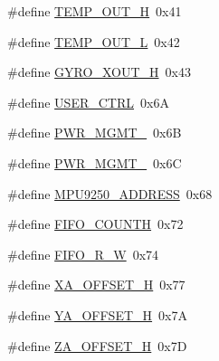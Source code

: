 \begin{DoxyCompactItemize}
\#define \hyperlink{i2c-interface_8c_ae8c4c28fe604535a3a57d0536c6e8175}{T\+E\+M\+P\+\_\+\+O\+U\+T\+\_\+H}~0x41
\item 
\#define \hyperlink{i2c-interface_8c_a7fe4a13198c0b3d8cf09802e7247fd2c}{T\+E\+M\+P\+\_\+\+O\+U\+T\+\_\+L}~0x42
\item 
\#define \hyperlink{i2c-interface_8c_a0016198ccf5ca2b7f41d7a23e6554373}{G\+Y\+R\+O\+\_\+\+X\+O\+U\+T\+\_\+H}~0x43
\item 
\#define \hyperlink{i2c-interface_8c_abd9eebb35aad7616fe0414952e2d477d}{U\+S\+E\+R\+\_\+\+C\+T\+RL}~0x6A
\item 
\#define \hyperlink{i2c-interface_8c_a96169eb207e721c1546cea9ffd8a35e4}{P\+W\+R\+\_\+\+M\+G\+M\+T\+\_}~0x6B
\item 
\#define \hyperlink{i2c-interface_8c_a23cfbcfd19dc88eb631309970f138e65}{P\+W\+R\+\_\+\+M\+G\+M\+T\+\_}~0x6C
\item 
\#define \hyperlink{i2c-interface_8c_af4d54e584a662662888836b3a9b9eb08}{M\+P\+U9250\+\_\+\+A\+D\+D\+R\+E\+SS}~0x68
\item 
\#define \hyperlink{i2c-interface_8c_adbbef0e95665e066deb615f04b347491}{F\+I\+F\+O\+\_\+\+C\+O\+U\+N\+TH}~0x72
\item 
\#define \hyperlink{i2c-interface_8c_ac12b6d897ba3ad98caeb3bd070c1c158}{F\+I\+F\+O\+\_\+\+R\+\_\+W}~0x74
\item 
\#define \hyperlink{i2c-interface_8c_ae78e00d167f08af6530c8ee3bcaeb298}{X\+A\+\_\+\+O\+F\+F\+S\+E\+T\+\_\+H}~0x77
\item 
\#define \hyperlink{i2c-interface_8c_a539098400cb39fa2ba99fb17b407e4f1}{Y\+A\+\_\+\+O\+F\+F\+S\+E\+T\+\_\+H}~0x7A
\item 
\#define \hyperlink{i2c-interface_8c_a3beaaac6dcdf69ac6d4971944650c92e}{Z\+A\+\_\+\+O\+F\+F\+S\+E\+T\+\_\+H}~0x7D
\end{DoxyCompactItemize}
